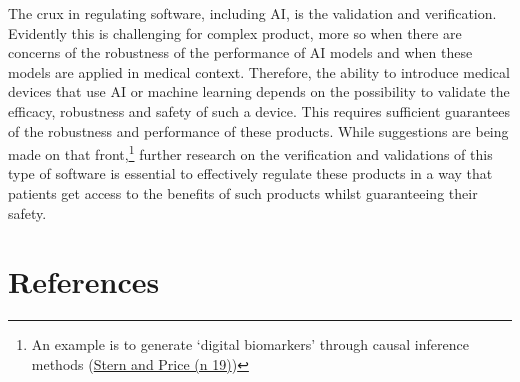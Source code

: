 \documentclass[
]{scrartcl}
\begin{document}
The crux in regulating software, including AI, is the validation and verification. Evidently this is challenging for complex product, more so when there are concerns of the robustness of the performance of AI models and when these models are applied in medical context. Therefore, the ability to introduce medical devices that use AI or machine learning depends on the possibility to validate the efficacy, robustness and safety of such a device. This requires sufficient guarantees of the robustness and performance of these products. While suggestions are being made on that front,\footnote{An example is to generate `digital biomarkers' through causal inference methods (\protect\hyperlink{ref-sternRegulatoryOversightCausal2019a}{Stern and Price (n 19)})} further research on the verification and validations of this type of software is essential to effectively regulate these products in a way that patients get access to the benefits of such products whilst guaranteeing their safety.

\hypertarget{references}{%
\section*{References}\label{references}}
\end{document}

